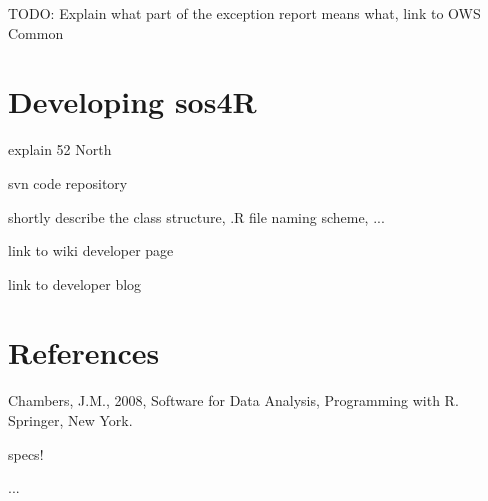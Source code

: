 \documentclass{article}
\begin{document}
TODO: Explain what part of the exception report means what, link to OWS Common


\section{Developing sos4R}

explain 52 North

svn code repository

shortly describe the class structure, .R file naming scheme, ...

link to wiki developer page

link to developer blog

\section*{References}
\begin{description}
\item Chambers, J.M., 2008, Software for Data Analysis, Programming with R.
Springer, New York.
\item specs!
\item ...
\end{description}
\end{document}
